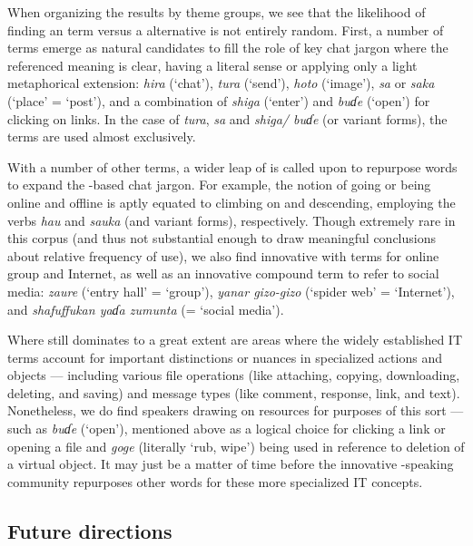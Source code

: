 \documentclass[output=paper
,newtxmath
,modfonts
,nonflat]{langsci/langscibook}
\begin{document}
When organizing the results by theme groups, we see that the likelihood of finding an  term versus a  alternative is not entirely random. First, a number of  terms emerge as natural candidates to fill the role of key chat jargon where the referenced meaning is clear, having a literal sense or applying only a light metaphorical extension: \textit{hira} (‘chat’), \textit{tura} (‘send’), \textit{hoto} (‘image’), \textit{sa} or \textit{saka} (‘place’ = ‘post’), and a combination of \textit{shiga} (‘enter’) and \textit{buɗe} (‘open’) for clicking on links. In the case of \textit{tura}, \textit{sa} and \textit{shiga/ buɗe} (or variant forms), the  terms are used almost exclusively. 

With a number of other terms, a wider leap of  is called upon to repurpose  words to expand the -based chat jargon. For example, the notion of going or being online and offline is aptly equated to climbing on and descending, employing the  verbs \textit{hau} and \textit{sauka} (and variant forms), respectively. Though extremely rare in this corpus (and thus not substantial enough to draw meaningful conclusions about relative frequency of use), we also find innovative  with terms for online group and Internet, as well as an innovative compound term to refer to social media: \textit{zaure} (‘entry hall’ = ‘group’), \textit{yanar gizo-gizo} (‘spider web’ = ‘Internet’), and \textit{shafuffukan yaɗa zumunta} (= ‘social media’).

Where  still dominates to a great extent are areas where the widely established  IT terms account for important distinctions or nuances in specialized actions and objects — including various file operations (like attaching, copying, downloading, deleting, and saving) and message types (like comment, response, link, and text). Nonetheless, we do find speakers drawing on  resources for purposes of this sort — such as \textit{buɗe} (‘open’), mentioned above as a logical choice for clicking a link or opening a file and \textit{goge} (literally ‘rub, wipe’) being used in reference to deletion of a virtual object. It may just be a matter of time before the innovative -speaking community repurposes other  words for these more specialized IT concepts.  

\subsection{Future directions}
\end{document}
